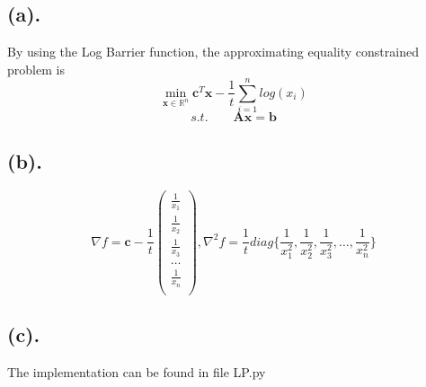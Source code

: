 \documentclass[12pt,letterpaper]{article}
\begin{document}
\newpage
\section{}
\subsection*{(a).}
By using the Log Barrier function,
the approximating equality constrained problem is 
$$\min_{\boldsymbol{x}\in\mathbb{R}^n} \boldsymbol{c}^T\boldsymbol{x}-\frac{1}{t}\sum_{i=1}^{n}log(x_i)$$
$$s.t.\qquad
\boldsymbol{Ax}=\boldsymbol{b}
$$

\subsection*{(b).}
$$\nabla f=\boldsymbol{c}-\frac{1}{t}\begin{pmatrix}
\frac{1}{x_1}\\
\frac{1}{x_2}\\
\frac{1}{x_3}\\
\dots\\
\frac{1}{x_n}\\
\end{pmatrix}, \nabla^2 f=\frac{1}{t}diag\{\frac{1}{x_1^2},\frac{1}{x_2^2},\frac{1}{x_3^2},\dots,\frac{1}{x_n^2}\}
$$
\subsection*{(c).}
The implementation can be found in file LP.py
\end{document}
